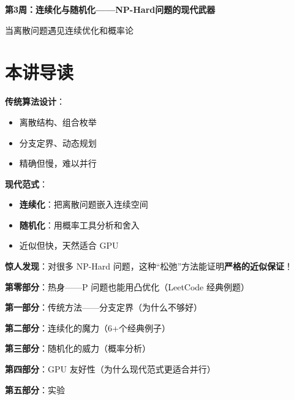 \documentclass[12pt, a4paper]{ctexart}
\begin{document}
\begin{center}
{\LARGE\bfseries 第3周：连续化与随机化——NP-Hard问题的现代武器}

\vspace{0.5cm}
{\large 当离散问题遇见连续优化和概率论}
\end{center}

\tableofcontents
\newpage

\section*{本讲导读}

\begin{blackboard}[本周的核心洞察]

\textbf{传统算法设计}：
\begin{itemize}
    \item 离散结构、组合枚举
    \item 分支定界、动态规划
    \item 精确但慢，难以并行
\end{itemize}

\textbf{现代范式}：
\begin{itemize}
    \item \textbf{连续化}：把离散问题嵌入连续空间
    \item \textbf{随机化}：用概率工具分析和舍入
    \item 近似但快，天然适合 GPU
\end{itemize}

\textbf{惊人发现}：对很多 NP-Hard 问题，这种``松弛''方法能证明\textbf{严格的近似保证}！

\end{blackboard}

\begin{blackboard}[内容结构]

\textbf{第零部分}：热身——P 问题也能用凸优化（LeetCode 经典例题）

\textbf{第一部分}：传统方法——分支定界（为什么不够好）

\textbf{第二部分}：连续化的魔力（6+个经典例子）

\textbf{第三部分}：随机化的威力（概率分析）

\textbf{第四部分}：GPU 友好性（为什么现代范式更适合并行）

\textbf{第五部分}：实验

\end{blackboard}
\end{document}
